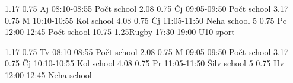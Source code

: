 \documentclass[a4paper,10pt]{report}
\begin{document}
\begin{landscape}
\begin{timetable}
   {1.17} {0.75} {Aj}                 {08:10-08:55}       {Počt}     {school}
   {2.08} {0.75} {Čj}                 {09:05-09:50}       {Počt}     {school}
   {3.17} {0.75} {M}                  {10:10-10:55}       {Kol}      {school}
   {4.08} {0.75} {Čj}                 {11:05-11:50}       {Neha}     {school}
   {5} {0.75}    {Pc}                 {12:00-12:45}       {Počt}     {school}
   {10.75} {1.25}{Rugby}              {17:30-19:00}       {U10}      {sport}
  
   {1.17} {0.75} {Tv}                 {08:10-08:55}       {Počt}     {school}
   {2.08} {0.75} {M}                  {09:05-09:50}       {Počt}     {school}
   {3.17} {0.75} {Čj}                 {10:10-10:55}       {Kol}      {school}
   {4.08} {0.75} {Pr}                 {11:05-11:50}       {Šilv}     {school}
   {5} {0.75}    {Hv}                 {12:00-12:45}       {Neha}     {school}   
  
\end{timetable}
\end{landscape}
\end{document}
